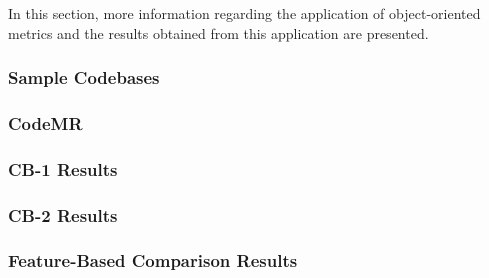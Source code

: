 In this section, more information regarding the application of object-oriented metrics and the results obtained from this application are presented.

\subsubsection{Sample Codebases}
\label{section:4.3.1}


\subsubsection{CodeMR}


\subsubsection{CB-1 Results}


\subsubsection{CB-2 Results}


\subsubsection{Feature-Based Comparison Results}

